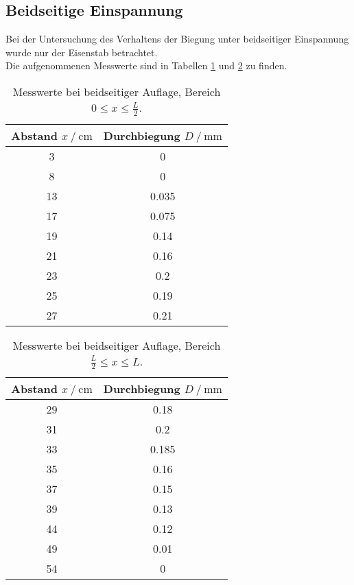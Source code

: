 \subsection{Beidseitige Einspannung}
  Bei der Untersuchung des Verhaltens der Biegung unter beidseitiger Einspannung wurde nur der 
  Eisenstab betrachtet. \\
  Die aufgenommenen Messwerte sind in Tabellen \ref{tab:rechts} und \ref{tab:links} zu finden. %

  \begin{table}
    \centering
    \caption{Messwerte bei beidseitiger Auflage, Bereich $0 \leq x \leq \frac{L}{2}$.}
    \label{tab:rechts}
    \begin{tabular}{c c}
      \toprule
      Abstand $x \mathbin{/} \si{\centi\m}$ & Durchbiegung $D \mathbin{/} \si{\milli\m}$ \\
      \midrule
      3  & 0\\
      8  & 0\\
      13 & 0.035\\
      17 & 0.075\\
      19 & 0.14\\
      21 & 0.16\\
      23 & 0.2\\
      25 & 0.19\\
      27 & 0.21\\
      \bottomrule
    \end{tabular}
  \end{table}

  \begin{table}
    \centering
    \caption{Messwerte bei beidseitiger Auflage, Bereich $\frac{L}{2} \leq x \leq L$.}
    \label{tab:links}
    \begin{tabular}{c c}
      \toprule
      Abstand $x \mathbin{/} \si{\centi\m}$ & Durchbiegung $D \mathbin{/} \si{\milli\m}$ \\
      \midrule
      29 & 0.18\\
      31 & 0.2\\
      33 & 0.185\\
      35 & 0.16\\
      37 & 0.15\\
      39 & 0.13\\
      44 & 0.12\\
      49 & 0.01\\
      54 & 0\\
      \bottomrule
    \end{tabular}
  \end{table}
  \FloatBarrier

